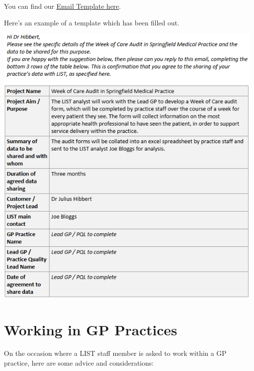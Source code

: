 \documentclass[
]{book}
\begin{document}
You can find our \href{https://scottish.sharepoint.com/:w:/r/sites/PHS-LIST/_layouts/15/Doc.aspx?sourcedoc=\%7BA10F07C3-CFFC-4A82-9CD7-A2D6DBA1D6DB\%7D\&file=LIST\%20IG\%20-\%20GP\%20practice\%20data\%20sharing\%20email\%20template.docx\&action=default\&mobileredirect=true}{Email Template here}.

Here's an example of a template which has been filled out.

\includegraphics[width=1\linewidth]{imgs/gp-emailtemplate-example}

\hypertarget{working-in-gp-practices}{%
\section{Working in GP Practices}\label{working-in-gp-practices}}

On the occasion where a LIST staff member is asked to work within a GP practice, here are some advice and considerations:
\end{document}
